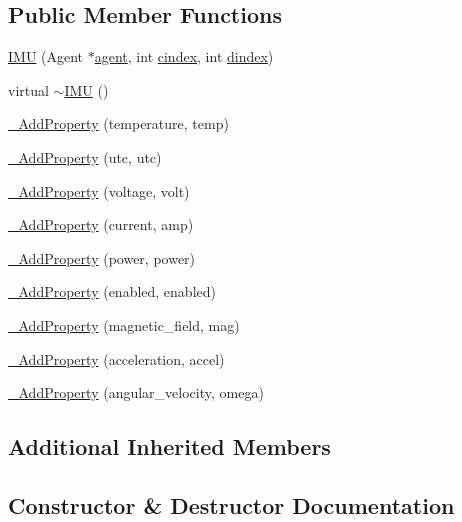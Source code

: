 \subsection*{Public Member Functions}
\begin{DoxyCompactItemize}
\item 
\hyperlink{classcubesat_1_1IMU_a1064c287bc98ce3d4042c1a08b59ca2b}{I\+MU} (Agent $\ast$\hyperlink{classcubesat_1_1Device_a8499108eccaf7375bea8ead0182391a6}{agent}, int \hyperlink{classcubesat_1_1Device_a1deca725b01f8ef37e49662da6db4e53}{cindex}, int \hyperlink{classcubesat_1_1Device_a8a2b3d6d7400e6796c31705058172982}{dindex})
\item 
virtual \hyperlink{classcubesat_1_1IMU_af9587ba377181ff65d9a3ef5bc19bb24}{$\sim$\+I\+MU} ()
\item 
\hyperlink{classcubesat_1_1IMU_ac48481fb52ed8c9155ccea48484738a2}{\+\_\+\+Add\+Property} (temperature, temp)
\item 
\hyperlink{classcubesat_1_1IMU_af384f6d5ac565eeb51c5f8ec50773845}{\+\_\+\+Add\+Property} (utc, utc)
\item 
\hyperlink{classcubesat_1_1IMU_a9b5f473c643c654fa963aa756296e186}{\+\_\+\+Add\+Property} (voltage, volt)
\item 
\hyperlink{classcubesat_1_1IMU_ab6d6a9261f4c761ffead00a40ffd731f}{\+\_\+\+Add\+Property} (current, amp)
\item 
\hyperlink{classcubesat_1_1IMU_ad3eaf019d8e56033e3a9a4a94775f814}{\+\_\+\+Add\+Property} (power, power)
\item 
\hyperlink{classcubesat_1_1IMU_ae66574a8d8e15c58e3ccd8193e59adea}{\+\_\+\+Add\+Property} (enabled, enabled)
\item 
\hyperlink{classcubesat_1_1IMU_aa6aeefd6704b05dfd59ca1476099aed7}{\+\_\+\+Add\+Property} (magnetic\+\_\+field, mag)
\item 
\hyperlink{classcubesat_1_1IMU_aedeb160bf398d47205b0206f1ee96fb7}{\+\_\+\+Add\+Property} (acceleration, accel)
\item 
\hyperlink{classcubesat_1_1IMU_aace8a3f33f5c953bbdd456ccf77c9d8a}{\+\_\+\+Add\+Property} (angular\+\_\+velocity, omega)
\end{DoxyCompactItemize}
\subsection*{Additional Inherited Members}


\subsection{Constructor \& Destructor Documentation}
\mbox{\label{classcubesat_1_1IMU_a1064c287bc98ce3d4042c1a08b59ca2b}} 

